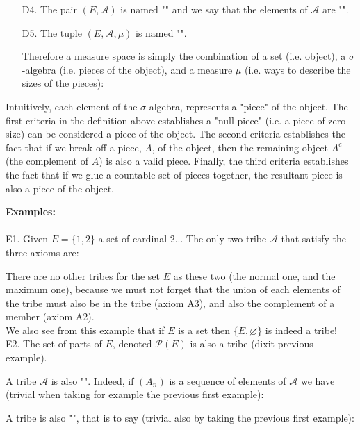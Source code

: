 \begin{enumerate}
	\item[D4.] The pair $(E,\mathcal{A})$ is named "" and we say that the elements of $\mathcal{A}$ are "".
	
	\item[D5.] The tuple $(E,\mathcal{A},\mu)$ is named "".
	
	Therefore a measure space is simply the combination of a set (i.e. object), a $\sigma$-algebra (i.e. pieces of the object), and a measure $\mu$ (i.e. ways to describe the sizes of the pieces):

	\end{enumerate}
	Intuitively, each element of the $\sigma$-algebra, represents a "piece" of the object. The first criteria in the definition above establishes a "null piece" (i.e. a piece of zero size) can be considered a piece of the object. The second criteria establishes the fact that if we break off a piece, $A$, of the object, then the remaining object $A^c$ (the complement of $A$) is also a valid piece. Finally, the third criteria establishes the fact that if we glue a countable set of pieces together, the resultant piece is also a piece of the object.
	\begin{tcolorbox}[colframe=black,colback=white,sharp corners]
	\textbf{{\Large {}}Examples:}\\\\
	E1. Given $E=\{1,2\}$ a set of cardinal 2... The only two tribe $\mathcal{A}$ that satisfy the three axioms are:
	
	There are no other tribes for the set $E$ as these two (the normal one, and the maximum one), because we must not forget that the union of each elements of the tribe must also be in the tribe (axiom A3), and also the complement of a member (axiom A2).\\
	
	We also see from this example that if $E$ is a set then $\{E,\varnothing\}$ is indeed a tribe!\\
	
	E2. The set of parts of $E$, denoted $\mathcal{P}(E)$ is also a tribe (dixit previous example).
	\end{tcolorbox}
	A tribe $\mathcal{A}$ is also "". Indeed, if $(A_n)$ is a sequence of elements of $\mathcal{A}$ we have (trivial when taking for example the previous first example):
	
	A tribe is also "", that is to say (trivial also by taking the previous first example):
	
